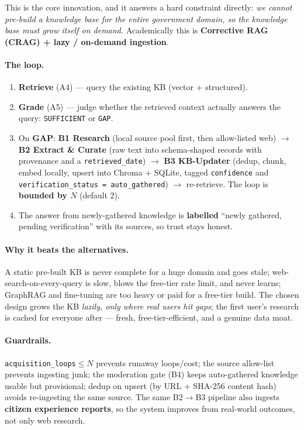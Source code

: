 \documentclass[11pt,a4paper]{article}
\begin{document}
This is the core innovation, and it answers a hard constraint directly: \emph{we cannot pre-build a
knowledge base for the entire government domain, so the knowledge base must grow itself on demand.}
Academically this is \textbf{Corrective RAG (CRAG) + lazy / on-demand ingestion}.

\paragraph{The loop.}
\begin{enumerate}[leftmargin=1.6em]
  \item \textbf{Retrieve} (A4) --- query the existing KB (vector + structured).
  \item \textbf{Grade} (A5) --- judge whether the retrieved context actually answers the query:
        \texttt{SUFFICIENT} or \texttt{GAP}.
  \item On \textbf{GAP}: \textbf{B1 Research} (local source pool first, then allow-listed web)
        $\to$ \textbf{B2 Extract \& Curate} (raw text into schema-shaped records with provenance and
        a \texttt{retrieved\_date}) $\to$ \textbf{B3 KB-Updater} (dedup, chunk, embed locally, upsert
        into Chroma + SQLite, tagged \texttt{confidence} and
        \texttt{verification\_status = auto\_gathered}) $\to$ re-retrieve. The loop is \textbf{bounded
        by $N$} (default 2).
  \item The answer from newly-gathered knowledge is \textbf{labelled} ``newly gathered, pending
        verification'' with its sources, so trust stays honest.
\end{enumerate}

\paragraph{Why it beats the alternatives.} A static pre-built KB is never complete for a huge domain
and goes stale; web-search-on-every-query is slow, blows the free-tier rate limit, and never learns;
GraphRAG and fine-tuning are too heavy or paid for a free-tier build. The chosen design grows
the KB \emph{lazily, only where real users hit gaps}; the first user's research is cached for everyone
after --- fresh, free-tier-efficient, and a genuine data moat.

\paragraph{Guardrails.} \texttt{acquisition\_loops}$\le N$ prevents runaway loops/cost; the source
allow-list prevents ingesting junk; the moderation gate (B4) keeps auto-gathered knowledge usable but
provisional; dedup on upsert (by URL + SHA-256 content hash) avoids re-ingesting the same source. The
same B2$\to$B3 pipeline also ingests \textbf{citizen experience reports}, so the system improves from
real-world outcomes, not only web research.
\end{document}
